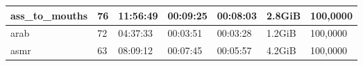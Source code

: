 \begin{table}[]
\begin{tabular}{l|l|l|l|l|l|l}
ass\_to\_mouths                                    & 76                                                  & 11:56:49                                                 & 00:09:25                                                & 00:08:03                                               & 2.8GiB                                               & 100,0000                                                      \\ \hline
arab                                               & 72                                                  & 04:37:33                                                 & 00:03:51                                                & 00:03:28                                               & 1.2GiB                                               & 100,0000                                                      \\ \hline
asmr                                               & 63                                                  & 08:09:12                                                 & 00:07:45                                                & 00:05:57                                               & 4.2GiB                                               & 100,0000                                                     
\end{tabular}
\label{tab:porn-granular}
\end{table}